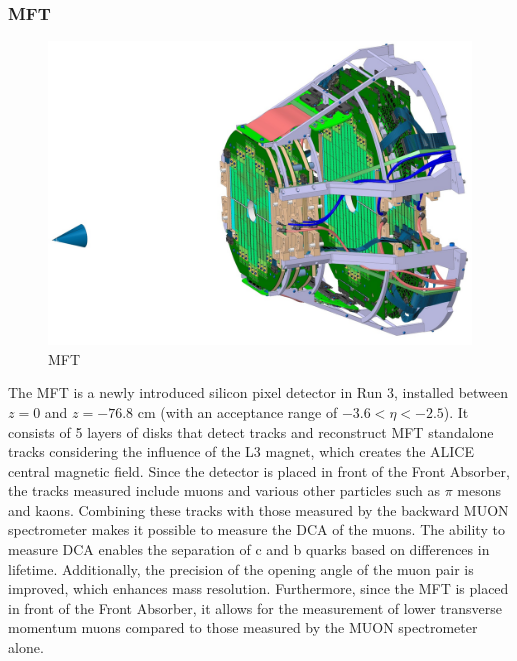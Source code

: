         \subsubsection{MFT}
            \begin{figure}[htbp]
                \centering
                \includegraphics[keepaspectratio, scale=0.17]{fig/2_3_MFT.jpg}
                \caption{MFT}
                \label{MFT}
            \end{figure}
            The MFT is a newly introduced silicon pixel detector in Run 3, installed between $z=0$ and $z=-76.8$ cm (with an acceptance range of $-3.6 < \eta < -2.5$). It consists of 5 layers of disks that detect tracks and reconstruct MFT standalone tracks considering the influence of the L3 magnet, which creates the ALICE central magnetic field. Since the detector is placed in front of the Front Absorber, the tracks measured include muons and various other particles such as $\pi$ mesons and kaons. Combining these tracks with those measured by the backward MUON spectrometer makes it possible to measure the DCA of the muons. The ability to measure DCA enables the separation of c and b quarks based on differences in lifetime. Additionally, the precision of the opening angle of the muon pair is improved, which enhances mass resolution. Furthermore, since the MFT is placed in front of the Front Absorber, it allows for the measurement of lower transverse momentum muons compared to those measured by the MUON spectrometer alone.

